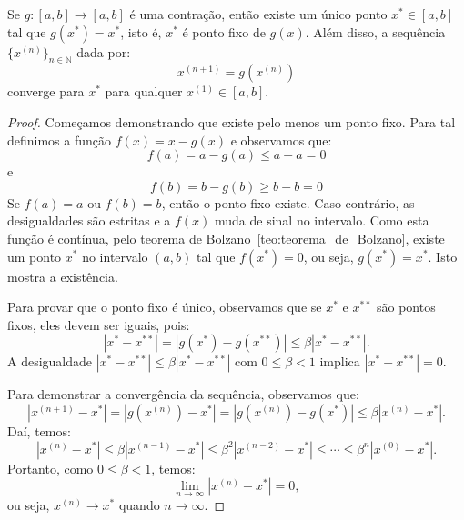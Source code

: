 \begin{teo}
 Se $g:[a,b]\to [a,b]$ é uma contração, então existe um único ponto $x^*\in [a, b]$ tal que $g(x^*)= x^*$, isto é, $x^*$ é ponto fixo de $g(x)$. Além disso, a sequência $\{x^{(n)}\}_{n\in\mathbb{N}}$ dada por:
 \begin{equation}
   x^{(n+1)}=g(x^{(n)})
 \end{equation}
converge para $x^*$ para qualquer $x^{(1)}\in [a, b]$.
\end{teo}
\begin{proof}
Começamos demonstrando que existe pelo menos um ponto fixo. Para tal definimos a função $f(x)=x-g(x)$ e observamos que:
\begin{equation}
  f(a)=a-g(a)\leq a-a=0
\end{equation}
e
\begin{equation}
  f(b)=b-g(b)\geq b-b=0
\end{equation}
Se $f(a)=a$ ou $f(b)=b$, então o ponto fixo existe. Caso contrário, as desigualdades são estritas e a $f(x)$ muda de sinal no intervalo.  Como esta função é contínua, pelo teorema de Bolzano~\ref{teo:teorema_de_Bolzano}, existe um ponto $x^*$ no intervalo $(a, b)$ tal que $f(x^*)=0$, ou seja, $g(x^*)=x^*$. Isto mostra a existência.

Para provar que o ponto fixo é único, observamos que se $x^*$ e $x^{**}$ são pontos fixos, eles devem ser iguais, pois:
\begin{equation}
  |x^*-x^{**}| = |g(x^{*})-g(x^{**})| \leq \beta |x^*-x^{**}|.
\end{equation}
A desigualdade $|x^*-x^{**}|\leq \beta |x^*-x^{**}|$ com $0\leq \beta<1$ implica $|x^*-x^{**}|=0$.

Para demonstrar a convergência da sequência, observamos que:
\begin{equation}
  |x^{(n+1)}-x^*| = |g(x^{(n)})-x^*| = |g(x^{(n)})-g(x^*)| \leq \beta |x^{(n)}-x^*|.
\end{equation}
Daí, temos:
\begin{equation}
  |x^{(n)}-x^*|\leq  \beta |x^{(n-1)}-x^*|\leq \beta^2 |x^{(n-2)}-x^*|\leq \cdots \leq \beta^{n}|x^{(0)}-x^*|.
\end{equation}
Portanto, como $0\leq\beta<1$, temos:
\begin{equation}
  \lim_{n\to\infty}|x^{(n)}-x^*|=0,
\end{equation}
ou seja, $x^{(n)}\to x^*$ quando $n\to\infty$.
\end{proof}

